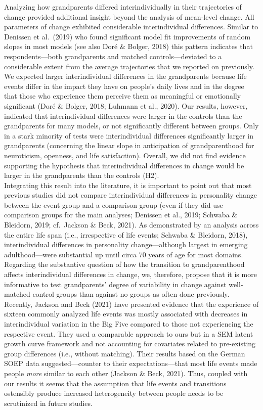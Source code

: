 \documentclass[
  english,
  man, noextraspace]{apa7}
\begin{document}
Analyzing how grandparents differed interindividually in their trajectories of change provided additional insight beyond the analysis of mean-level change. All parameters of change exhibited considerable interindividual differences. Similar to Denissen et al.~(2019) who found significant model fit improvements of random slopes in most models (see also Doré \& Bolger, 2018) this pattern indicates that respondents---both grandparents and matched controls---deviated to a considerable extent from the average trajectories that we reported on previously.\\
We expected larger interindividual differences in the grandparents because life events differ in the impact they have on people's daily lives and in the degree that those who experience them perceive them as meaningful or emotionally significant (Doré \& Bolger, 2018; Luhmann et al., 2020). Our results, however, indicated that interindividual differences were larger in the controls than the grandparents for many models, or not significantly different between groups. Only in a stark minority of tests were interindividual differences significantly larger in grandparents (concerning the linear slope in anticipation of grandparenthood for neuroticism, openness, and life satisfaction). Overall, we did not find evidence supporting the hypothesis that interindividual differences in change would be larger in the grandparents than the controls (H2).\\
Integrating this result into the literature, it is important to point out that most previous studies did not compare interindividual differences in personality change between the event group and a comparison group (even if they did use comparison groups for the main analyses; Denissen et al., 2019; Schwaba \& Bleidorn, 2019; cf.~Jackson \& Beck, 2021). As demonstrated by an analysis across the entire life span (i.e., irrespective of life events; Schwaba \& Bleidorn, 2018), interindividual differences in personality change---although largest in emerging adulthood---were substantial up until circa 70 years of age for most domains. Regarding the substantive question of how the transition to grandparenthood affects interindividual differences in change, we, therefore, propose that it is more informative to test grandparents' degree of variability in change against well-matched control groups than against no groups as often done previously.\\
Recently, Jackson and Beck (2021) have presented evidence that the experience of sixteen commonly analyzed life events was mostly associated with decreases in interindividual variation in the Big Five compared to those not experiencing the respective event. They used a comparable approach to ours but in a SEM latent growth curve framework and not accounting for covariates related to pre-existing group differences (i.e., without matching). Their results based on the German SOEP data suggested---counter to their expectations---that most life events made people \emph{more} similar to each other (Jackson \& Beck, 2021). Thus, coupled with our results it seems that the assumption that life events and transitions ostensibly produce increased heterogeneity between people needs to be scrutinized in future studies.
\end{document}
